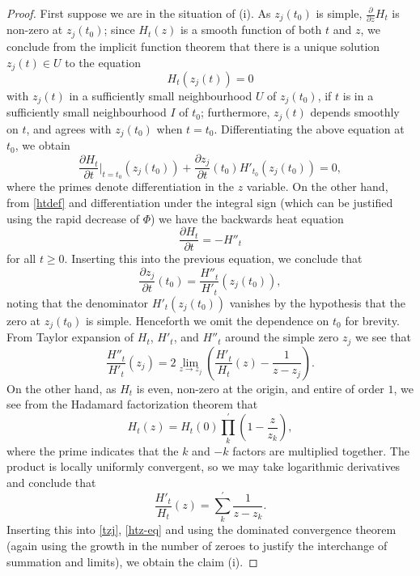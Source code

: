 \begin{proof}  First suppose we are in the situation of (i).  As $z_j(t_0)$ is simple, $\frac{\partial}{\partial z} H_t$ is non-zero at $z_j(t_0)$; since $H_t(z)$ is a smooth function of both $t$ and $z$, we conclude from the implicit function theorem that there is a unique solution $z_j(t) \in U$ to the equation
$$ H_t( z_j(t) ) = 0$$
with $z_j(t)$ in a sufficiently small neighbourhood $U$ of $z_j(t_0)$, if $t$ is in a sufficiently small neighbourhood $I$ of $t_0$; furthermore, $z_j(t)$ depends smoothly on $t$, and agrees with $z_j(t_0)$ when $t=t_0$.  Differentiating the above equation at $t_0$, we obtain
$$ \frac{\partial H_t}{\partial t}|_{t=t_0}( z_j(t_0) ) + \frac{\partial z_j}{\partial t}(t_0) H'_{t_0}(z_j(t_0)) = 0,$$
where the primes denote differentiation in the $z$ variable.
On the other hand, from \eqref{htdef} and differentiation under the integral sign (which can be justified using the rapid decrease of $\Phi$) we have the backwards heat equation
\begin{equation}\label{back}
\frac{\partial H_t}{\partial t} = -H''_t
\end{equation}
for all $t \geq 0$.  Inserting this into the previous equation, we conclude that
\begin{equation}\label{tzj}
\frac{\partial z_j}{\partial t}(t_0)  = \frac{H''_t}{H'_t}( z_j(t_0) ),
\end{equation}
noting that the denominator $H'_t(z_j(t_0))$ vanishes by the hypothesis that the zero at $z_j(t_0)$ is simple.  Henceforth we omit the dependence on $t_0$ for brevity.  From Taylor expansion of $H_t$, $H'_t$, and $H''_t$ around the simple zero $z_j$ we see that
\begin{equation}\label{htz-eq}
 \frac{H''_t}{H'_t}( z_j) = 2 \lim_{z \to z_j}\left(  \frac{H'_t}{H_t}( z) - \frac{1}{z-z_j} \right).
\end{equation}
On the other hand, as $H_t$ is even, non-zero at the origin, and entire of order $1$, we see from the Hadamard factorization theorem that
$$ H_t(z) = H_t(0) \prod_k^{\prime} \left(1 - \frac{z}{z_k}\right),$$
where the prime indicates that the $k$ and $-k$ factors are multiplied together.  The product is locally uniformly convergent, so we may take logarithmic derivatives and conclude that
$$ \frac{H'_t}{H_t}(z) = \sum_k^{\prime} \frac{1}{z-z_k}.$$
Inserting this into \eqref{tzj}, \eqref{htz-eq} and using the dominated convergence theorem (again using the growth in the number of zeroes to justify the interchange of summation and limits), we obtain the claim (i).


\end{proof}
